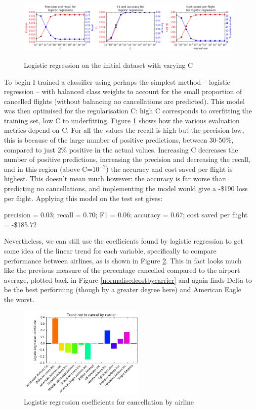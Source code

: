 \documentclass[a4paper]{article}
\begin{document}
\begin{figure}[h]
\centering
\hbox{\hspace{-0.5in}
\includegraphics[width=1.15\textwidth]{../figures/classification/log_reg_C.png}}
\caption{Logistic regression on the initial dataset with varying C}
\label{logreg}
\end{figure}

To begin I trained a classifier using perhaps the simplest method -- logistic regression -- with balanced class weights to account for the small proportion of cancelled flights (without balancing no cancellations are predicted). This model was then optimised for the regularisation C: high C corresponds to overfitting the training set, low C to underfitting. Figure \ref{logreg} shows how the various evaluation metrics depend on C. For all the values the recall is high but the precision low, this is because of the large number of positive predictions, between 30-50\%, compared to just 2\% positive in the actual values. Increasing C decreases the number of positive predictions, increasing the precision and decreasing the recall, and in this region (above C=$10^{-2}$) the accuracy and cost saved per flight is highest. This doesn't mean much however: the accuracy is far worse than predicting no cancellations, and implementing the model would give a -\$190 loss per flight. Applying this model on the test set gives:

\noindent precision = 0.03; recall = 0.70; F1 = 0.06; accuracy = 0.67; cost saved per flight = -\$185.72

Nevertheless, we can still use the coefficients found by logistic regression to get some idea of the linear trend for each variable, specifically to compare performance between airlines, as is shown in Figure \ref{logregcarrier}. This in fact looks much like the previous measure of the percentage cancelled compared to the airport average, plotted back in Figure \ref{normalisedcostbycarrier} and again finds Delta to be the best performing (though by a greater degree here) and American Eagle the worst.

\begin{figure}[h]
\centering
\includegraphics[width=0.55\textwidth]{../figures/classification/log_reg_carrier.png}
\caption{Logistic regression coefficients for cancellation by airline}
\label{logregcarrier}
\end{figure}
\end{document}
